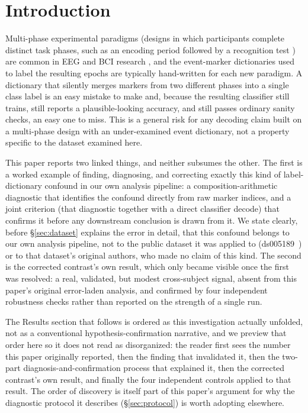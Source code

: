 \documentclass[preprint,12pt]{elsarticle}
\begin{document}
\section{Introduction}\label{sec:intro}

Multi-phase experimental paradigms (designs in which participants complete distinct task phases, such as an encoding period followed by a recognition test \cite{pallerwagner2002,ruggcurran2007}) are common in EEG and BCI research \cite{wolpaw2002,lotte2007,lotte2018}, and the event-marker dictionaries used to label the resulting epochs are typically hand-written for each new paradigm. A dictionary that silently merges markers from two different phases into a single class label is an easy mistake to make and, because the resulting classifier still trains, still reports a plausible-looking accuracy, and still passes ordinary sanity checks, an easy one to miss. This is a general risk for any decoding claim built on a multi-phase design with an under-examined event dictionary, not a property specific to the dataset examined here.

This paper reports two linked things, and neither subsumes the other. The first is a worked example of finding, diagnosing, and correcting exactly this kind of label-dictionary confound \cite{frenay2014} in our own analysis pipeline: a composition-arithmetic diagnostic that identifies the confound directly from raw marker indices, and a joint criterion (that diagnostic together with a direct classifier decode) that confirms it before any downstream conclusion is drawn from it. We state clearly, before \S\ref{sec:dataset} explains the error in detail, that this confound belongs to our own analysis pipeline, not to the public dataset it was applied to (ds005189~\cite{helbing2025}) or to that dataset's original authors, who made no claim of this kind. The second is the corrected contrast's own result, which only became visible once the first was resolved: a real, validated, but modest cross-subject signal, absent from this paper's original error-laden analysis, and confirmed by four independent robustness checks rather than reported on the strength of a single run.

The Results section that follows is ordered as this investigation actually unfolded, not as a conventional hypothesis-confirmation narrative, and we preview that order here so it does not read as disorganized: the reader first sees the number this paper originally reported, then the finding that invalidated it, then the two-part diagnosis-and-confirmation process that explained it, then the corrected contrast's own result, and finally the four independent controls applied to that result. The order of discovery is itself part of this paper's argument for why the diagnostic protocol it describes (\S\ref{sec:protocol}) is worth adopting elsewhere.
\end{document}
